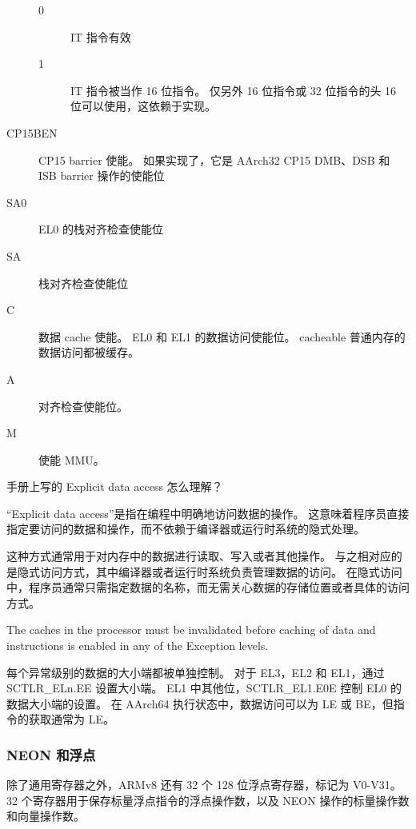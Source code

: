 \begin{description}
\begin{description}
      \item[0] IT 指令有效
      \item[1] IT 指令被当作 16 位指令。
        仅另外 16 位指令或 32 位指令的头 16 位可以使用，这依赖于实现。
    \end{description}
  \item[CP15BEN] CP15 barrier 使能。
    如果实现了，它是 AArch32 CP15 DMB、DSB 和 ISB barrier 操作的使能位
  \item[SA0] EL0 的栈对齐检查使能位
  \item[SA] 栈对齐检查使能位
  \item[C] 数据 cache 使能。
    EL0 和 EL1 的数据访问使能位。
    cacheable 普通内存的数据访问都被缓存。
  \item[A] 对齐检查使能位。
  \item[M] 使能 MMU。
\end{description}

\begin{probsolu}[title={Problem and Solution \theprob}]{
    手册上写的 Explicit data access 怎么理解？}

  “Explicit data access”是指在编程中明确地访问数据的操作。
  这意味着程序员直接指定要访问的数据和操作，而不依赖于编译器或运行时系统的隐式处理。

  这种方式通常用于对内存中的数据进行读取、写入或者其他操作。
  与之相对应的是隐式访问方式，其中编译器或者运行时系统负责管理数据的访问。
  在隐式访问中，程序员通常只需指定数据的名称，而无需关心数据的存储位置或者具体的访问方式。

\end{probsolu}

\begin{remark}
  The caches in the processor must be invalidated before caching of data and instructions is
enabled in any of the Exception levels.
\end{remark}


每个异常级别的数据的大小端都被单独控制。
对于 EL3，EL2 和 EL1，通过 SCTLR\_ELn.EE 设置大小端。
EL1 中其他位，SCTLR\_EL1.E0E 控制 EL0 的数据大小端的设置。
在 AArch64 执行状态中，数据访问可以为 LE 或 BE，但指令的获取通常为 LE。

\subsubsection{NEON 和浮点}

除了通用寄存器之外，ARMv8 还有 32 个 128 位浮点寄存器，标记为 V0-V31。
32 个寄存器用于保存标量浮点指令的浮点操作数，以及 NEON 操作的标量操作数和向量操作数。

